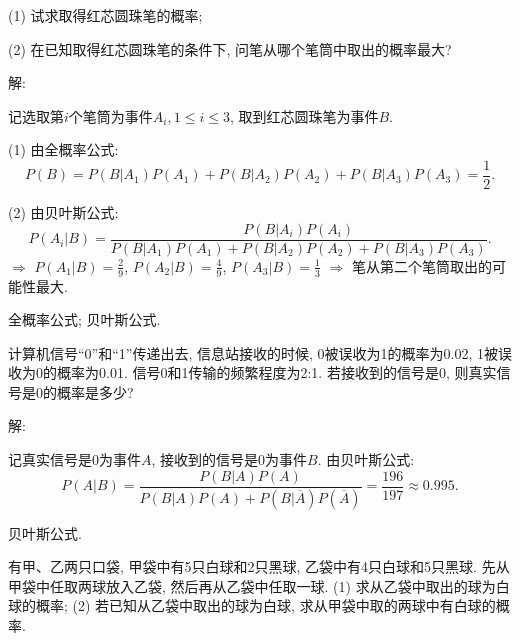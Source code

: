 \documentclass[standard]{ExBook}
\begin{document}
\begin{qitems}
\begin{bbox}
\begin{shaded}
(1) 试求取得红芯圆珠笔的概率;

(2) 在已知取得红芯圆珠笔的条件下, 问笔从哪个笔筒中取出的概率最大?
    \end{shaded}
    \end{bbox}

\vspace{-5em}

    \begin{bbox}
解: 

记选取第$i$个笔筒为事件$A_{i},1 \leq i \leq 3$, 取到红芯圆珠笔为事件$B$.

(1) 由全概率公式:
$$P(B)=P(B|A_{1})P(A_{1})+P(B|A_{2})P(A_{2})+P(B|A_{3})P(A_{3})=\frac{1}{2}.$$

(2) 由贝叶斯公式:
$$P(A_{i}|B)=\frac{P(B|A_{i})P(A_{i})}{P(B|A_{1})P(A_{1})+P(B|A_{2})P(A_{2})+P(B|A_{3})P(A_{3})}.$$
$\Longrightarrow$ $P(A_{1}|B)=\frac{2}{9}$, $P(A_{2}|B)=\frac{4}{9}$, $P(A_{3}|B)=\frac{1}{3}$ $\Longrightarrow$ 笔从第二个笔筒取出的可能性最大.

\textcolor{themeColor}{\selectfont {} 全概率公式; 贝叶斯公式.}
    \end{bbox}

\vspace{-5em}

    \begin{bbox}
    \begin{shaded}
        \qitem
计算机信号“0”和“1”传递出去, 信息站接收的时候, 0被误收为1的概率为0.02, 1被误收为0的概率为0.01. 信号0和1传输的频繁程度为2:1. 若接收到的信号是0, 则真实信号是0的概率是多少?
    \end{shaded}
    \end{bbox}

\vspace{-5em}

    \begin{bbox}
解: 

记真实信号是0为事件$A$, 接收到的信号是0为事件$B$. 由贝叶斯公式:
$$P(A|B)=\frac{P(B|A)P(A)}{P(B|A)P(A)+P(B|\overline{A})P(\overline{A})}=\frac{196}{197}\approx0.995.$$

\textcolor{themeColor}{\selectfont {} 贝叶斯公式.}
    \end{bbox}

\vspace{-5em}

    \begin{bbox}
    \begin{shaded}
        \qitem
有甲、乙两只口袋, 甲袋中有5只白球和2只黑球, 乙袋中有4只白球和5只黑球. 先从甲袋中任取两球放入乙袋, 然后再从乙袋中任取一球.
(1) 求从乙袋中取出的球为白球的概率;
(2) 若已知从乙袋中取出的球为白球, 求从甲袋中取的两球中有白球的概率.
    \end{shaded}
    \end{bbox}


\end{qitems}
\end{document}
